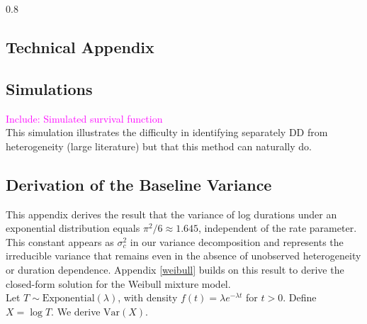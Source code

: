 \documentclass[12pt]{article}
\theoremstyle{definition}
\theoremstyle{remark}
\begin{document}
\clearpage
\begin{spacing}{0.8}


\end{spacing}

\newpage
\begin{appendices}
\renewcommand{\thetable}{A.\arabic{table}}
\renewcommand{\thesection}{\Alph{section}}
\renewcommand{\thefigure}{A.\arabic{figure}}
\setcounter{table}{0}
\setcounter{figure}{0}

\section{Technical Appendix }\label{TecnicalAppendix}

\subsection{Simulations}
\label{app_simulations}
\textcolor{magenta}{Include: Simulated survival function}\\ 

This simulation illustrates the difficulty in identifying separately DD from heterogeneity (large literature) but that this method can naturally do.

\subsection{Derivation of the Baseline Variance} 
\label{baseline_var}






This appendix derives the result that the variance of log durations under an exponential distribution equals $\pi^2/6 \approx 1.645$, independent of the rate parameter. This constant appears as $\sigma^2_c$ in our variance decomposition and represents the irreducible variance that remains even in the absence of unobserved heterogeneity or duration dependence. Appendix \ref{weibull} builds on this result to derive the closed-form solution for the Weibull mixture model. \\ 

Let $T \sim \text{Exponential}(\lambda)$, with density $f(t) = \lambda e^{-\lambda t}$ for $t > 0$. Define $X = \log T$. We derive $\text{Var}(X)$.



\end{appendices}
\end{document}
